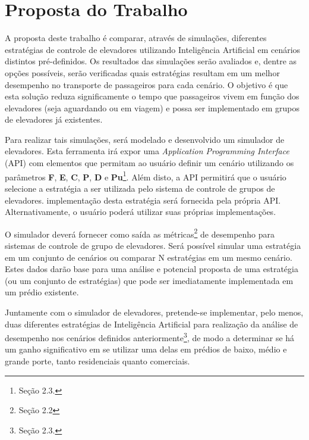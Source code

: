 \chapter{\label{chap:proposal}Proposta do Trabalho}

A proposta deste trabalho é comparar, através de simulações, diferentes
estratégias de controle de elevadores utilizando Inteligência Artificial em
cenários distintos pré-definidos. Os resultados das simulações serão avaliados
e, dentre as opções possíveis, serão verificadas quais estratégias resultam em
um melhor desempenho no transporte de passageiros para cada cenário. O objetivo
é que esta solução reduza significamente o tempo que passageiros vivem em função
dos elevadores (seja aguardando ou em viagem) e possa ser implementado em grupos
de elevadores já existentes.

Para realizar tais simulações, será modelado e desenvolvido um simulador de
elevadores. Esta ferramenta irá expor uma \textit{Application Programming
Interface} (API) com elementos que permitam ao usuário definir um cenário
utilizando os parâmetros \textbf{F}, \textbf{E}, \textbf{C}, \textbf{P},
\textbf{D} e \textbf{Pu}\footnote{Seção 2.3.}. Além disto, a API permitirá que o
usuário selecione a estratégia a ser utilizada pelo sistema de controle de
grupos de elevadores. implementação desta estratégia será fornecida pela própria
API. Alternativamente, o usuário poderá utilizar suas próprias implementações.

O simulador deverá fornecer como saída as métricas\footnote{Seção 2.2} de
desempenho para sistemas de controle de grupo de elevadores. Será possível
simular uma estratégia em um conjunto de cenários ou comparar N estratégias em
um mesmo cenário. Estes dados darão base para uma análise e potencial proposta
de uma estratégia (ou um conjunto de estratégias) que pode ser imediatamente
implementada em um prédio existente.

Juntamente com o simulador de elevadores, pretende-se implementar, pelo menos,
duas diferentes estratégias de Inteligência Artificial para realização da
análise de desempenho nos cenários definidos anteriormente\footnote{Seção 2.3.},
de modo a determinar se há um ganho significativo em se utilizar uma delas em
prédios de baixo, médio e grande porte, tanto residenciais quanto comerciais.
